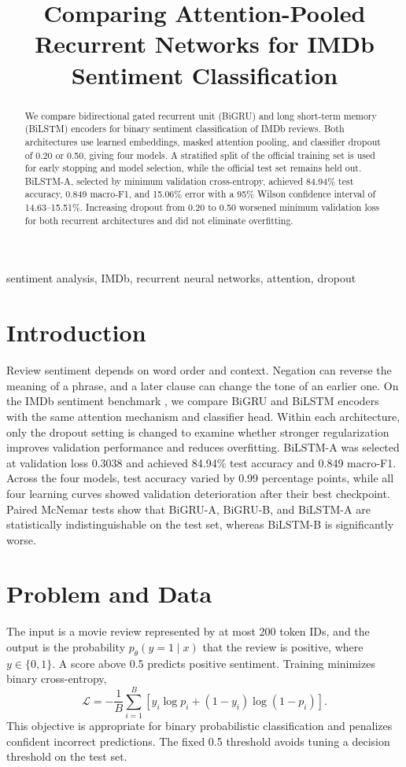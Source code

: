 \documentclass[conference]{IEEEtran}
\title{Comparing Attention-Pooled Recurrent Networks for IMDb Sentiment Classification}
\author{
\IEEEauthorblockN{Nicholas Ampimah, Yin Po Po Aung, and Jane Ohia}
\IEEEauthorblockA{ CSCE 879 - Introduction to Deep Learning}
}
\begin{document}
\maketitle

\begin{abstract}
We compare bidirectional gated recurrent unit (BiGRU) and long short-term memory (BiLSTM) encoders for binary sentiment classification of IMDb reviews. Both architectures use learned embeddings, masked attention pooling, and classifier dropout of 0.20 or 0.50, giving four models. A stratified split of the official training set is used for early stopping and model selection, while the official test set remains held out. BiLSTM-A, selected by minimum validation cross-entropy, achieved 84.94\% test accuracy, 0.849 macro-F1, and 15.06\% error with a 95\% Wilson confidence interval of 14.63--15.51\%. Increasing dropout from 0.20 to 0.50 worsened minimum validation loss for both recurrent architectures and did not eliminate overfitting.
\end{abstract}

\begin{IEEEkeywords}
sentiment analysis, IMDb, recurrent neural networks, attention, dropout
\end{IEEEkeywords}

\section{Introduction}
Review sentiment depends on word order and context. Negation can reverse the meaning of a phrase, and a later clause can change the tone of an earlier one. On the IMDb sentiment benchmark \cite{maas}, we compare BiGRU and BiLSTM encoders with the same attention mechanism and classifier head. Within each architecture, only the dropout setting is changed to examine whether stronger regularization improves validation performance and reduces overfitting. BiLSTM-A was selected at validation loss 0.3038 and achieved 84.94\% test accuracy and 0.849 macro-F1. Across the four models, test accuracy varied by 0.99 percentage points, while all four learning curves showed validation deterioration after their best checkpoint. Paired McNemar tests show that BiGRU-A, BiGRU-B, and BiLSTM-A are statistically indistinguishable on the test set, whereas BiLSTM-B is significantly worse.

\section{Problem and Data}
The input is a movie review represented by at most 200 token IDs, and the output is the probability $p_\theta(y=1\mid x)$ that the review is positive, where $y\in\{0,1\}$. A score above 0.5 predicts positive sentiment. Training minimizes binary cross-entropy,
\begin{equation}
\mathcal{L}=-\frac{1}{B}\sum_{i=1}^{B}
[y_i\log p_i+(1-y_i)\log(1-p_i)].
\end{equation}
This objective is appropriate for binary probabilistic classification and penalizes confident incorrect predictions. The fixed 0.5 threshold avoids tuning a decision threshold on the test set.
\end{document}
